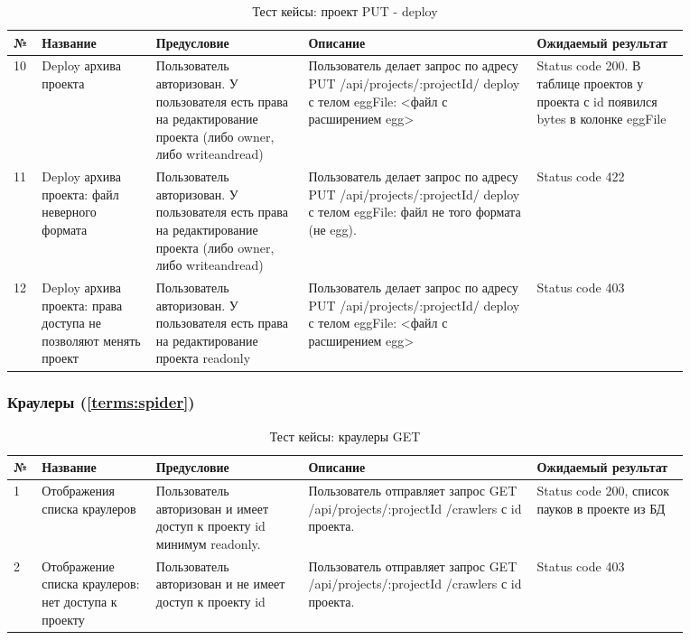 \documentclass[a4paper,12pt]{article}
\begin{document}
\begin{table}[htb]
		\centering
		\begin{tabular}{|p{0.02\linewidth}|p{0.15\linewidth}|p{0.2\linewidth}|p{0.3\linewidth}|p{0.2\linewidth}|} 
			\hline
			\textbf{№} & \textbf{Название} & \textbf{Предусловие} & \textbf{Описание} & \textbf{Ожидаемый результат} \\ \hline
            10 & Deploy архива проекта & Пользователь авторизован. У пользователя есть права на редактирование проекта (либо owner, либо writeandread) & Пользователь делает запрос по адресу PUT      /api/projects/:projectId/ deploy с телом eggFile: <файл с расширением egg> & Status code 200. В таблице проектов у проекта с id появился bytes в колонке eggFile \\ \hline
            11 & Deploy архива проекта: файл неверного формата & Пользователь авторизован. У пользователя есть права на редактирование проекта (либо owner, либо writeandread) & Пользователь делает запрос по адресу PUT      /api/projects/:projectId/ deploy с телом eggFile: файл не того формата (не egg). & Status code 422 \\ \hline
            12 & Deploy архива проекта: права доступа не позволяют менять проект & Пользователь авторизован. У пользователя есть права на редактирование проекта readonly & Пользователь делает запрос по адресу PUT      /api/projects/:projectId/ deploy с телом eggFile: <файл с расширением egg> & Status code 403 \\ \hline
			
		\end{tabular}
	\caption{Тест кейсы: проект PUT - deploy}
	\end{table}
	\clearpage
	
	\subsubsection{Краулеры (\ref{terms:spider})}
	
	\begin{table}[htb]
		\centering
		\begin{tabular}{|p{0.02\linewidth}|p{0.15\linewidth}|p{0.2\linewidth}|p{0.3\linewidth}|p{0.2\linewidth}|} 
			\hline
			\textbf{№} & \textbf{Название} & \textbf{Предусловие} & \textbf{Описание} & \textbf{Ожидаемый результат} \\ \hline
            1 &  Отображения списка краулеров  & Пользователь авторизован и имеет доступ к проекту id минимум readonly. & Пользователь отправляет запрос GET      /api/projects/:projectId /crawlers с id проекта.
 & Status code 200, список пауков в проекте из БД \\ \hline
            2 & Отображение списка краулеров: нет доступа к проекту & Пользователь авторизован и не имеет доступ к проекту id & Пользователь отправляет запрос GET      /api/projects/:projectId /crawlers с id проекта. & Status code 403 \\ \hline
			
		\end{tabular}
	\caption{Тест кейсы: краулеры GET}
	\end{table}
	
\end{document}

